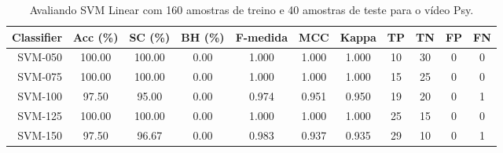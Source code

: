 \begin{table}[!htb]
\centering
\caption{Avaliando SVM Linear com 160 amostras de treino e 40 amostras de teste para o vídeo Psy.}
\label{tab:linear-svm-Psy}
\begin{tabular}{r|c|c|c|c|c|c|c|c|c|c}
\hline\hline
Classifier & Acc (\%) & SC (\%) & BH (\%) & F-medida & MCC & Kappa & TP & TN & FP & FN \\ \hline
SVM-050 & 100.00 & 100.00 & 0.00 & 1.000 & 1.000 & 1.000 & 10 & 30 & 0 & 0 \\ 
SVM-075 & 100.00 & 100.00 & 0.00 & 1.000 & 1.000 & 1.000 & 15 & 25 & 0 & 0 \\ 
SVM-100 & 97.50 & 95.00 & 0.00 & 0.974 & 0.951 & 0.950 & 19 & 20 & 0 & 1 \\ 
SVM-125 & 100.00 & 100.00 & 0.00 & 1.000 & 1.000 & 1.000 & 25 & 15 & 0 & 0 \\ 
SVM-150 & 97.50 & 96.67 & 0.00 & 0.983 & 0.937 & 0.935 & 29 & 10 & 0 & 1 \\ 
\hline\hline
\end{tabular}
\end{table}
